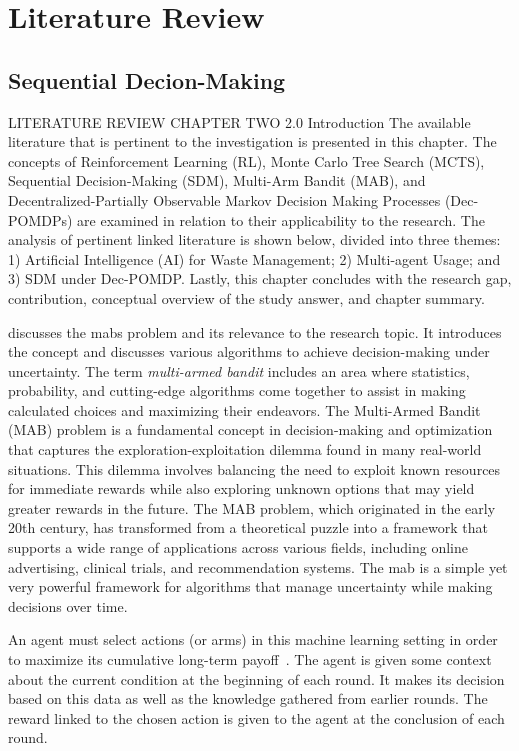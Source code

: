 \section{Literature Review}
\label{sec:Literature Review} %

\subsection{Sequential Decion-Making}
\label{sub:lit-rev_sequential-decion} %

LITERATURE REVIEW
CHAPTER TWO
2.0 Introduction
The available literature that is pertinent to the investigation is presented in this chapter. The concepts of Reinforcement Learning (RL), Monte Carlo Tree Search (MCTS), Sequential Decision-Making (SDM), Multi-Arm Bandit (MAB), and Decentralized-Partially Observable Markov Decision Making Processes (Dec-POMDPs) are examined in relation to their applicability to the research. The analysis of pertinent linked literature is shown below, divided into three themes: 1) Artificial Intelligence (AI) for Waste Management; 2) Multi-agent Usage; and 3) SDM under Dec-POMDP. Lastly, this chapter concludes with the research gap, contribution, conceptual overview of the study answer, and chapter summary.

\Cite{slivkins:2024} discusses the \glspl{mab}  problem and its relevance to the research topic. It introduces the concept and discusses various algorithms to achieve decision-making under uncertainty. The term \emph{multi-armed bandit} includes an area where statistics, probability, and cutting-edge algorithms come together to assist in making calculated choices and maximizing their endeavors.
The Multi-Armed Bandit (MAB) problem is a fundamental concept in decision-making and optimization that captures the exploration-exploitation dilemma found in many real-world situations. This dilemma involves balancing the need to exploit known resources for immediate rewards while also exploring unknown options that may yield greater rewards in the future. The MAB problem, which originated in the early 20th century, has transformed from a theoretical puzzle into a framework that supports a wide range of applications across various fields, including online advertising, clinical trials, and recommendation systems. 
The \gls{mab} is a simple yet very powerful framework for algorithms that manage uncertainty while making decisions over time. 

An agent must select actions (or arms) in this machine learning setting in order to maximize its cumulative long-term payoff~\cite{zhao:2025}. The agent is given some context about the current condition at the beginning of each round. It makes its decision based on this data as well as the knowledge gathered from earlier rounds. The reward linked to the chosen action is given to the agent at the conclusion of each round.

